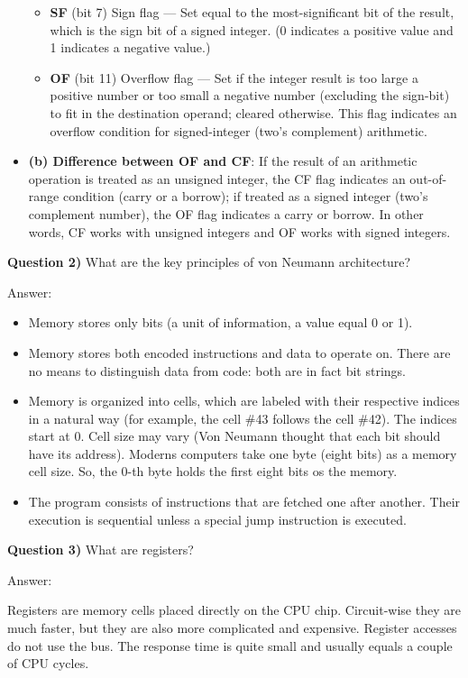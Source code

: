 \documentclass[11pt, a4paper]{amsart}
\numberwithin{equation}{section}
\theoremstyle{plain} %
\theoremstyle{definition}
\theoremstyle{remark}
\begin{document}
\begin{itemize}
\begin{itemize}
        \item \textbf{SF} (bit 7) Sign flag — Set equal to the most-significant bit of the result, which is the sign bit of a signed integer. (0 indicates a positive value and 1 indicates a negative value.)
        \item \textbf{OF} (bit 11) Overflow flag — Set if the integer result is too large a positive number or too small a negative number (excluding the sign-bit) to fit in the destination operand; cleared otherwise. This flag indicates an overflow condition for signed-integer (two’s complement) arithmetic.
    \end{itemize}
    \item \textbf{(b) Difference between OF and CF}: If the result of an arithmetic operation is treated as an unsigned integer, the CF flag indicates an out-of-range condition (carry or a borrow); if treated as a signed integer (two’s complement number), the OF flag indicates a carry or borrow. In other words, CF works with unsigned integers and OF works with signed integers.
\end{itemize}

\textbf{Question 2)} What are the key principles of von Neumann architecture?

Answer:

\begin{itemize}
    \item Memory stores only bits (a unit of information, a value equal 0 or 1).
    \item Memory stores both encoded instructions and data to operate on. There are no means to distinguish data from code: both are in fact bit strings.
    \item Memory is organized into cells, which are labeled with their respective indices in a natural way (for example, the cell \#43 follows the cell \#42). The indices start at 0. Cell size may vary (Von Neumann thought that each bit should have its address). Moderns computers take one byte (eight bits) as a memory cell size. So, the 0-th byte holds the first eight bits os the memory.
    \item The program consists of instructions that are fetched one after another. Their execution is sequential unless a special jump instruction is executed.
\end{itemize}

\textbf{Question 3)} What are registers?

Answer:

	Registers are memory cells placed directly on the CPU chip. Circuit-wise they are much faster, but they are also more
complicated and expensive. Register accesses do not use the bus. The response time is quite small and usually equals a couple of CPU
cycles.
\end{document}
